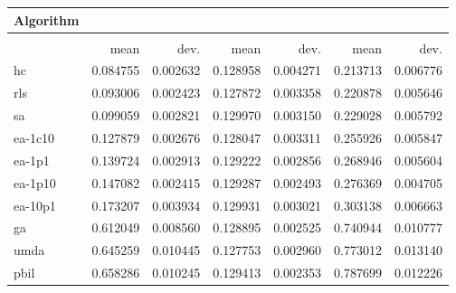 \begin{tabular}{@{} l *{6}{>{{}}N{1}{2}} @{}}
\toprule
{Algorithm} &  \\
\midrule
&  &  &  \\
\midrule
& {mean} & {dev.} & {mean} & {dev.} & {mean} & {dev.} \\
\midrule
hc & 0.084755 & 0.002632 & 0.128958 & 0.004271 & 0.213713 & 0.006776 \\
rls & 0.093006 & 0.002423 & 0.127872 & 0.003358 & 0.220878 & 0.005646 \\
sa & 0.099059 & 0.002821 & 0.129970 & 0.003150 & 0.229028 & 0.005792 \\
ea-1c10 & 0.127879 & 0.002676 & 0.128047 & 0.003311 & 0.255926 & 0.005847 \\
ea-1p1 & 0.139724 & 0.002913 & 0.129222 & 0.002856 & 0.268946 & 0.005604 \\
ea-1p10 & 0.147082 & 0.002415 & 0.129287 & 0.002493 & 0.276369 & 0.004705 \\
ea-10p1 & 0.173207 & 0.003934 & 0.129931 & 0.003021 & 0.303138 & 0.006663 \\
ga & 0.612049 & 0.008560 & 0.128895 & 0.002525 & 0.740944 & 0.010777 \\
umda & 0.645259 & 0.010445 & 0.127753 & 0.002960 & 0.773012 & 0.013140 \\
pbil & 0.658286 & 0.010245 & 0.129413 & 0.002353 & 0.787699 & 0.012226 \\
\bottomrule
\end{tabular}
